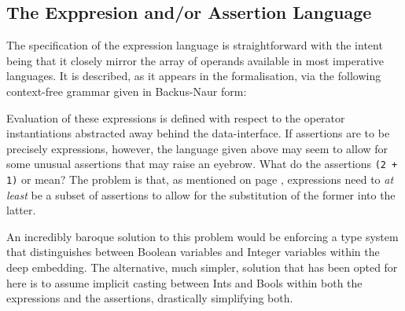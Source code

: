 \documentclass[oneside,12pt]{article}
\newcommand{\textM}[1]{\ensuremath{\mathpzc{#1}}}
\begin{document}
 
\subsection{The Exppresion and/or Assertion Language}
\label{sec:spec:expression-assertion-lang}

The specification of the expression language is straightforward with the intent being that it closely mirror the array of operands available in most imperative languages. It is described, as it appears in the formalisation, via the following context-free grammar given in Backus-Naur form:



Evaluation of these expressions is defined with respect to the operator instantiations abstracted away behind the data-interface. If assertions are to be precisely expressions, however, the language given above may seem to allow for some unusual assertions that may raise an eyebrow. What do the assertions \texttt{(2 + 1)} or  mean? The problem is that, as mentioned on page \pageref{page:expassertionprob}, expressions need to \emph{at least} be a subset of assertions to allow for the substitution of the former into the latter.

An incredibly baroque solution to this problem would be enforcing a type system that distinguishes between Boolean variables and Integer variables within the deep embedding. The alternative, much simpler, solution that has been opted for here is to assume implicit casting between Ints and Bools within both the expressions and the assertions, drastically simplifying both.
\end{document}
